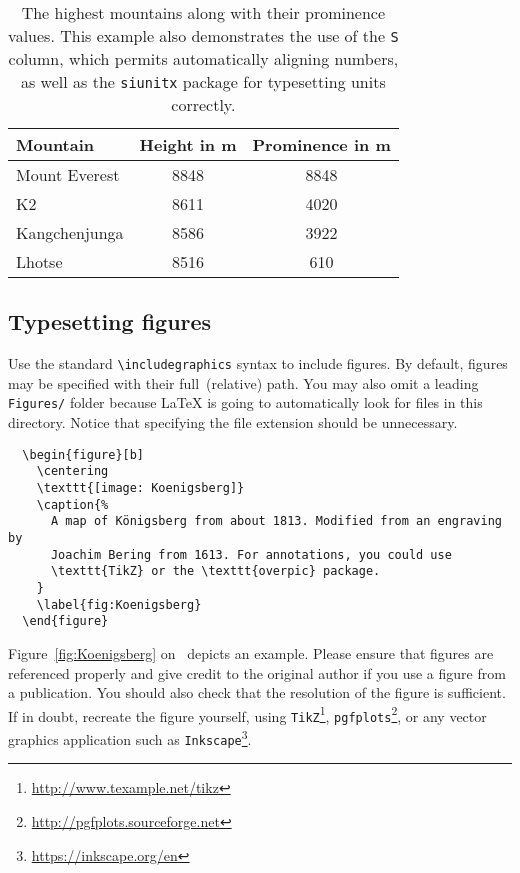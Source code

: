\begin{table}[tb]
  \centering
  \begin{tabular}{lSS}
    \toprule
    \textbf{Mountain}      & \textbf{Height in \si{\meter}} & \textbf{Prominence in \si{\meter}}\\
    \midrule
    Mount Everest & 8848 & 8848\\
    K2            & 8611 & 4020\\
    Kangchenjunga & 8586 & 3922\\
    Lhotse        & 8516 & 610  \\
    \bottomrule
  \end{tabular}
  \caption{
    The highest mountains along with their prominence values.
    This example also demonstrates the use of the \texttt{S} column,
    which permits automatically aligning numbers, as well as the
    \texttt{siunitx} package for typesetting units correctly.
  }
  \label{tab:Mountains}
\end{table}

\subsection{Typesetting figures}

Use the standard \verb|\includegraphics| syntax to include figures. By
default, figures may be specified with their full~(relative) path. You
may also omit a leading \verb|Figures/| folder because \LaTeX{} is going
to automatically look for files in this directory.
%
Notice that specifying the file extension should be unnecessary.
%
\begin{verbatim}
  \begin{figure}[b]
    \centering
    \texttt{[image: Koenigsberg]}
    \caption{%
      A map of Königsberg from about 1813. Modified from an engraving by
      Joachim Bering from 1613. For annotations, you could use
      \texttt{TikZ} or the \texttt{overpic} package.
    }
    \label{fig:Koenigsberg}
  \end{figure}
\end{verbatim}
%
Figure~\autoref{fig:Koenigsberg} on~\pageref{fig:Koenigsberg} depicts an
example.
%
Please ensure that figures are referenced properly and give credit to
the original author if you use a figure from a publication.
%
You should also check that the resolution of the figure is sufficient.
%
If in doubt, recreate the figure yourself, using \verb|TikZ|\footnote{\url{http://www.texample.net/tikz}}, \verb|pgfplots|\footnote{\url{http://pgfplots.sourceforge.net}}, or any vector graphics application such as \verb|Inkscape|\footnote{\url{https://inkscape.org/en}}.

